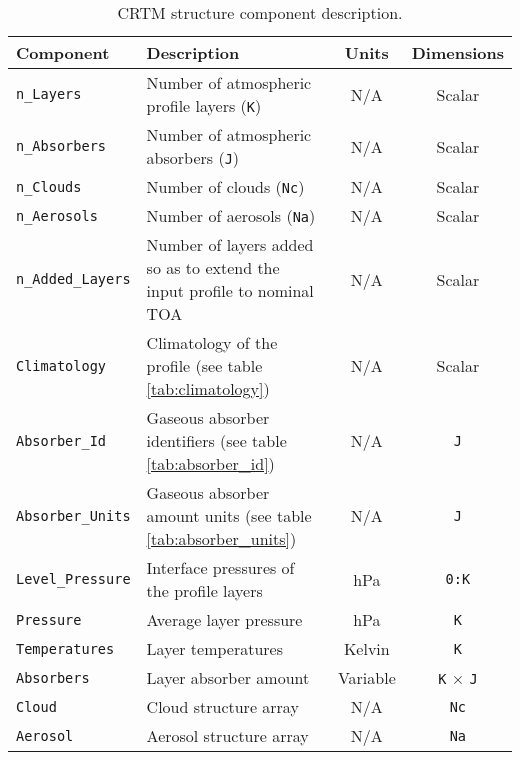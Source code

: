 \begin{table}[htp]
  \centering
  \begin{tabular}{l p{7cm} c c}
    \hline
    \sffamily\textbf{Component} & \sffamily\textbf{Description} & \sffamily\textbf{Units} & \sffamily\textbf{Dimensions} \\
    \hline\hline
    \texttt{n\_Layers}    & Number of atmospheric profile layers (\texttt{K}) & N/A & Scalar \\
    \texttt{n\_Absorbers} & Number of atmospheric absorbers (\texttt{J}) & N/A & Scalar \\
    \texttt{n\_Clouds}    & Number of clouds (\texttt{Nc}) & N/A & Scalar \\
    \texttt{n\_Aerosols}  & Number of aerosols (\texttt{Na}) & N/A & Scalar \\
    \texttt{n\_Added\_Layers} & Number of layers added so as to extend the input profile to nominal TOA  & N/A & Scalar \\
    \texttt{Climatology} & Climatology of the profile (see table \ref{tab:climatology}) & N/A & Scalar \\
    \texttt{Absorber\_Id} & Gaseous absorber identifiers (see table \ref{tab:absorber_id}) & N/A & \texttt{J}\\
    \texttt{Absorber\_Units} & Gaseous absorber amount units (see table \ref{tab:absorber_units}) & N/A & \texttt{J}\\
    \texttt{Level\_Pressure} & Interface pressures of the profile layers & hPa & \texttt{0:K} \\
    \texttt{Pressure} & Average layer pressure & hPa & \texttt{K} \\
    \texttt{Temperatures} & Layer temperatures & Kelvin & \texttt{K} \\
    \texttt{Absorbers} & Layer absorber amount & Variable & \texttt{K} $\times$ \texttt{J}\\
    \texttt{Cloud} & Cloud structure array & N/A & \texttt{Nc}\\
    \texttt{Aerosol} & Aerosol structure array & N/A & \texttt{Na}\\
    \hline
  \end{tabular}
  \caption{CRTM \Atmosphere{} structure component description.}
  \label{tab:atmosphere_structure}
\end{table}


